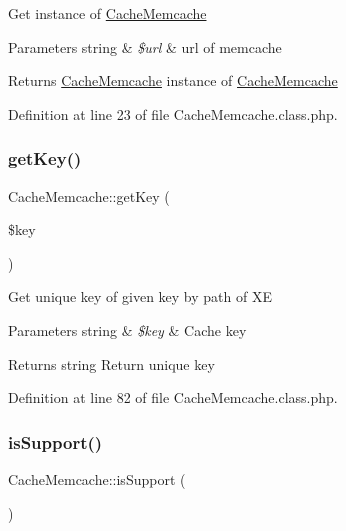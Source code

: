 Get instance of \hyperlink{classCacheMemcache}{Cache\+Memcache}


\begin{DoxyParams}[1]{Parameters}
string & {\em \$url} & url of memcache \\
\hline
\end{DoxyParams}
\begin{DoxyReturn}{Returns}
\hyperlink{classCacheMemcache}{Cache\+Memcache} instance of \hyperlink{classCacheMemcache}{Cache\+Memcache} 
\end{DoxyReturn}


Definition at line 23 of file Cache\+Memcache.\+class.\+php.

\hypertarget{classCacheMemcache_a27f400a936cc3efb152acc12edb379e1}{}\label{classCacheMemcache_a27f400a936cc3efb152acc12edb379e1} 
\subsubsection{\texorpdfstring{get\+Key()}{getKey()}}
{\footnotesize\ttfamily Cache\+Memcache\+::get\+Key (\begin{DoxyParamCaption}\item[{}]{\$key }\end{DoxyParamCaption})}

Get unique key of given key by path of XE


\begin{DoxyParams}[1]{Parameters}
string & {\em \$key} & Cache key \\
\hline
\end{DoxyParams}
\begin{DoxyReturn}{Returns}
string Return unique key 
\end{DoxyReturn}


Definition at line 82 of file Cache\+Memcache.\+class.\+php.

\hypertarget{classCacheMemcache_a4ea35bdd7cc26faa01996dbbc162720f}{}\label{classCacheMemcache_a4ea35bdd7cc26faa01996dbbc162720f} 
\subsubsection{\texorpdfstring{is\+Support()}{isSupport()}}
{\footnotesize\ttfamily Cache\+Memcache\+::is\+Support (\begin{DoxyParamCaption}{ }\end{DoxyParamCaption})}

